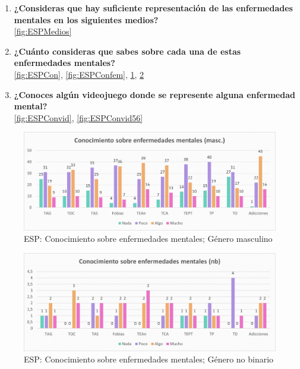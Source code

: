 \documentclass[12pt, a4paper,twoside,titlepage]{book}
\begin{document}
\begin{enumerate}[label=\textbf{\arabic*}.]
     \item \textbf{¿Consideras que hay suficiente representación de las enfermedades mentales en los siguientes medios? }\\
     \ref{fig:ESPMedios}
     \item \textbf{¿Cuánto consideras que sabes sobre cada una de estas enfermedades mentales? }\\
     \ref{fig:ESPCon}, \ref{fig:ESPConfem}, \ref{fig:ESPConmasc}, \ref{fig:ESPConnb}
     \item \textbf{¿Conoces algún videojuego donde se represente alguna enfermedad mental? }\\
     \ref{fig:ESPConvid},   \ref{fig:ESPConvid56}
\end{enumerate}



\begin{figure}
    \centering
    \includegraphics[width=1\linewidth]{ANEXO ESP/10AnexESPConmasc}
    \caption{ESP: Conocimiento sobre enfermedades mentales; Género masculino}
    \label{fig:ESPConmasc}
\end{figure}
\begin{figure}
    \centering
    \includegraphics[width=1\linewidth]{ANEXO ESP/11AnexESPConnb}
    \caption{ESP: Conocimiento sobre enfermedades mentales; Género no binario}
    \label{fig:ESPConnb}
\end{figure}
\end{document}
